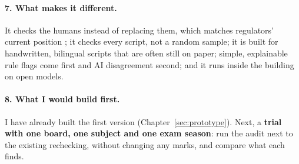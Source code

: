 \paragraph{7. What makes it different.} It checks the humans instead of replacing them, which matches regulators' current
position \citep{ofqual2026}; it checks every script, not a random sample; it is built for handwritten, bilingual scripts
that are often still on paper; simple, explainable rule flags come first and AI disagreement second; and it runs inside
the building on open models.

\paragraph{8. What I would build first.} I have already built the first version (Chapter~\ref{sec:prototype}). Next, a
\textbf{trial with one board, one subject and one exam season}: run the audit next to the existing rechecking, without
changing any marks, and compare what each finds.
